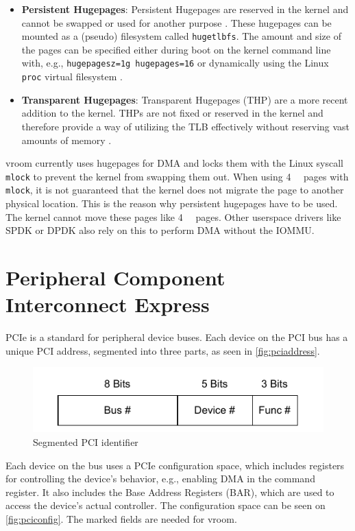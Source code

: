 \begin{itemize}
    \item \textbf{Persistent Hugepages}: Persistent Hugepages are reserved in the kernel and cannot be swapped or used for another purpose \cite{hugetlbkerneldocs}. These hugepages can be mounted as a (pseudo) filesystem called \texttt{hugetlbfs}. The amount and size of the pages can be specified either during boot on the kernel command line with, e.g., \texttt{hugepagesz=1g hugepages=16} or dynamically using the Linux \texttt{proc} virtual filesystem \cite{hugetlbkerneldocs}.
    \item \textbf{Transparent Hugepages}: Transparent Hugepages (THP) are a more recent addition to the kernel. THPs are not fixed or reserved in the kernel and therefore provide a way of utilizing the TLB effectively without reserving vast amounts of memory \cite{transhugekerneldocs}.
\end{itemize}

vroom currently uses hugepages for DMA and locks them with the Linux syscall \texttt{mlock} to prevent the kernel from swapping them out. When using \qty{4}{\kibi\byte} pages with \texttt{mlock}, it is not guaranteed that the kernel does not migrate the page to another physical location. This is the reason why persistent hugepages have to be used. The kernel cannot move these pages like \qty{4}{\kibi\byte} pages. Other userspace drivers like SPDK or DPDK also rely on this to perform DMA without the IOMMU.

\section{Peripheral Component Interconnect Express}
PCIe is a standard for peripheral device buses. Each device on the PCI bus has a unique PCI address, segmented into three parts, as seen in \autoref{fig:pciaddress}.

\begin{figure}[H]
    \centering
    \includegraphics[width=.7\textwidth]{figures/pciaddress.pdf}
    \caption{Segmented PCI identifier}
    \label{fig:pciaddress}
\end{figure}

Each device on the bus uses a PCIe configuration space, which includes registers for controlling the device's behavior, e.g., enabling DMA in the command register. It also includes the Base Address Registers (BAR), which are used to access the device's actual controller. The configuration space can be seen on \autoref{fig:pciconfig}. The marked fields are needed for vroom.

